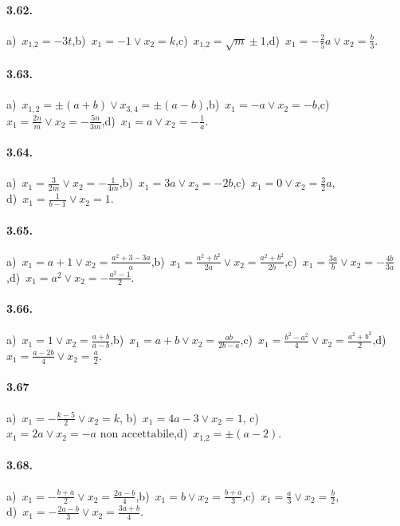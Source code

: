 \paragraph{3.62.} a)~$x_{1\text{,}2} =-3t$,\quad b)~$x_{1} =-1\vee x_{2} = k$,\quad c)~$x_{1\text{,}2} = \sqrt{m} \pm 1$,\quad d)~$x_{1} =-\frac{2}{5}a \vee x_{2} =\frac{b}{3}$.

\paragraph{3.63.} a)~$x_{1,2}=\pm(a+b)\vee x_{3,4}=\pm(a-b)$,\quad b)~$x_{1} =-a\vee x_{2}=-b$,\quad c)~$x_{1} =\frac{2n}{m}\vee x_{2}=-\frac{5n}{3m}$,\quad d)~$x_{1} =a\vee x_{2}=-\frac{1}{a}$.

\paragraph{3.64.} a)~$x_{1}=\frac{3}{2m}\vee x_{2}=-\frac{1}{4m}$,\quad b)~$x_{1}=3a\vee x_{2}=-2b$,\quad c)~$x_{1} =0\vee x_{2}=\frac{3}{2}a$,\protect\\
d)~$x_{1} =\frac{1}{b-1}\vee x_{2}=1$.

\paragraph{3.65.} a)~$x_{1}=a+1\vee x_{2}=\frac{a^{2}+3-3a}{a}$,\quad b)~$x_{1} =\frac{a^{2}+b^{2}}{2a}\vee x_{2}=\frac{a^{2}+b^{2}}{2b}$,\quad c)~$x_{1} =\frac{3a}{b}\vee x_{2}=-\frac{4b}{3a}$,\quad d)~$x_{1} =a^{2}\vee x_{2}=-\frac{a^{2}-1}{2}$.

\paragraph{3.66.} a)~$x_{1}=1\vee x_{2}=\frac{a+b}{a-b}$,\quad b)~$x_{1} =a+b\vee x_{2}=\frac{ab}{2b-a}$,\quad c)~$x_{1} =\frac{b^{2}-a^{2}}{4}\vee x_{2}=\frac{a^{2}+b^{2}}{2}$,\quad d)~$x_{1} =\frac{a-2b}{4}\vee x_{2}=\frac{a}{2}$.

\paragraph{3.67} a)~$x_{1}=-\frac{k-5}{2}\vee x_{2}=k$,\; b)~$x_{1} =4a-3\vee x_{2}=1$,\; c)~$x_{1} =2a\vee x_{2}=-a\text{ non accettabile}$,\quad d)~$x_{1\text{,}2}=\pm(a-2)$.

\paragraph{3.68.} a)~$x_{1}=-\frac{b+a}{2}\vee x_{2}=\frac{2a-b}{4}$,\quad b)~$x_{1} =b\vee x_{2}=\frac{b+a}{3}$,\quad c)~$x_{1} =\frac{a}{3}\vee x_{2}=\frac{b}{2}$,\protect\\
d)~$x_{1} =-\frac{2a-b}{3}\vee x_{2}=\frac{3a+b}{4}$.

